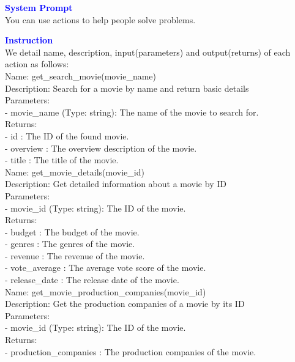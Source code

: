 \begin{tcolorbox}[breakable,title=Prompt Details for Movie]
\textbf{\textcolor{blue}{System Prompt}}\\ 
You can use actions to help people solve problems.\\
\textbf{\textcolor{blue}{Instruction}}\\
We detail name, description, input(parameters) and output(returns) of each action as follows:\\
Name: get\_search\_movie(movie\_name)\\
Description: Search for a movie by name and return basic details\\
Parameters:\\
- movie\_name (Type: string): The name of the movie to search for.\\
Returns:\\
- id : The ID of the found movie.\\
- overview : The overview description of the movie.\\
- title : The title of the movie.\\

Name: get\_movie\_details(movie\_id)\\
Description: Get detailed information about a movie by ID\\
Parameters:\\
- movie\_id (Type: string): The ID of the movie.\\
Returns:\\
- budget : The budget of the movie.\\
- genres : The genres of the movie.\\
- revenue : The revenue of the movie.\\
- vote\_average : The average vote score of the movie.\\
- release\_date : The release date of the movie.\\

Name: get\_movie\_production\_companies(movie\_id)\\
Description: Get the production companies of a movie by its ID\\
Parameters:\\
- movie\_id (Type: string): The ID of the movie.\\
Returns:\\
- production\_companies : The production companies of the movie.\\


\end{tcolorbox}
